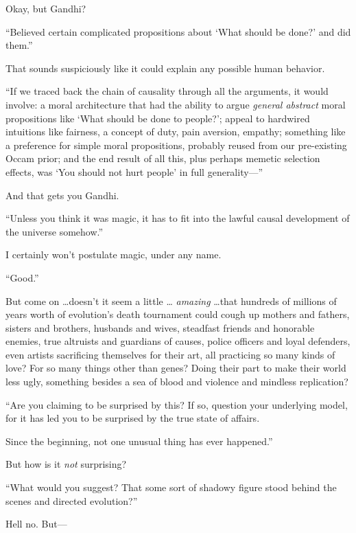 {
 Okay, but Gandhi?}

{
 ``Believed certain complicated propositions about
`What should be done?' and did
them.''}

{
 That sounds suspiciously like it could explain any possible human
behavior.}

{
 ``If we traced back the chain of causality
through all the arguments, it would involve: a moral architecture that
had the ability to argue \textit{general abstract} moral propositions
like `What should be done to people?';
appeal to hardwired intuitions like fairness, a concept of duty, pain
aversion, empathy; something like a preference for simple moral
propositions, probably reused from our pre-existing Occam prior; and
the end result of all this, plus perhaps memetic selection effects, was
`You should not hurt people' in full
generality---''}

{
 And that gets you Gandhi.}

{
 ``Unless you think it was magic, it has to fit
into the lawful causal development of the universe
somehow.''}

{
 I certainly won't postulate magic, under any
name.}

{
 ``Good.''}

{
 But come on \ldots doesn't it seem a little \ldots
\textit{amazing} \ldots that hundreds of millions of years worth of
evolution's death tournament could cough up mothers and
fathers, sisters and brothers, husbands and wives, steadfast friends
and honorable enemies, true altruists and guardians of causes, police
officers and loyal defenders, even artists sacrificing themselves for
their art, all practicing so many kinds of love? For so many things
other than genes? Doing their part to make their world less ugly,
something besides a sea of blood and violence and mindless
replication?}

{
 ``Are you claiming to be surprised by this? If
so, question your underlying model, for it has led you to be surprised
by the true state of affairs.}

{
 Since the beginning,\newline
 not one unusual thing\newline
 has ever happened.''}

{
 But how is it \textit{not} surprising?}

{
 ``What would you suggest? That some sort of
shadowy figure stood behind the scenes and directed
evolution?''}

{
 Hell no. But---}

